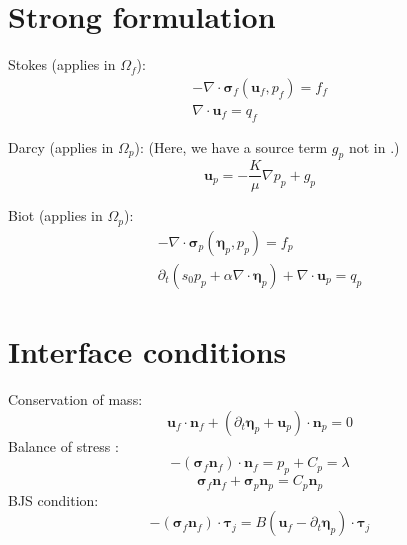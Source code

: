 \documentclass{article}
\newcommand{\mathspace}[1]{\ensuremath{#1}\xspace} %
\newcommand{\sigmabf}{\mathspace{\boldsymbol{\sigma}}}
\newcommand{\grad}{\mathspace{\nabla}}
\renewcommand{\div}{\mathspace{\nabla \cdot}}
\newcommand{\ddt}[1]{\mathspace{\partial_t #1}}
\newcommand{\taubf}{\mathspace{\boldsymbol{\tau}}}
\newcommand{\stokes}{\mathspace{\Omega_{f}}}
\newcommand{\darcy}{\mathspace{\Omega_{p}}}
\newcommand{\nf}{\mathspace{\mathbf{n}_f}}
\newcommand{\np}{\mathspace{\mathbf{n}_p}}
\newcommand{\uf}{\mathspace{\mathbf{u}_f}}
\newcommand{\up}{\mathspace{\mathbf{u}_p}}
\newcommand{\pf}{\mathspace{p_f}}
\newcommand{\pp}{\mathspace{p_p}}
\newcommand{\disp}{\mathspace{\boldsymbol{\eta}_p}}
\begin{document}
\section{Strong formulation}

Stokes (applies in \stokes):
\begin{subequations}
  \begin{align}
    - \div \sigmabf_f (\uf, \pf) = f_f    \label{eq:stokes_stress} \\
    \div \uf = q_f    \label{eq:stokes_conservation}
  \end{align}
\end{subequations}

Darcy (applies in \darcy):
(Here, we have a source term $g_p$ not in \cite{ambartsumyan}.)
\begin{equation}
    \up = - \frac {K} {\mu} \grad \pp + g_p     \label{eq:darcy}
  \end{equation}

  
Biot (applies in \darcy):
\begin{subequations}
  \begin{align}
    - \div \sigmabf_p (\disp, \pp) = f_p     \label{eq:biot_stress} \\
    \ddt{} \left ( s_0 \pp + \alpha \div \disp \right ) + \div \up = q_p    \label{eq:biot_conservation}
  \end{align}
\end{subequations}
\section{Interface conditions}

Conservation of mass:
\begin{equation}
\uf  \cdot \nf + \left ( \ddt{\disp} + \up \right ) \cdot \np = 0  \label{eq:massconservation}
\end{equation}
Balance of stress :
\begin{equation}
  -(\sigmabf_f \nf) \cdot \nf = \pp + C_p = \lambda  \label{eq:stressbalance1_mult}
\end{equation}
\begin{equation}
  \sigmabf_f \nf + \sigmabf_p \np = C_p \np \label{eq:stressbalance2}
\end{equation}
BJS condition:
\begin{equation}
  -(\sigmabf_f \nf) \cdot \taubf_j = B \left ( \uf - \ddt{\disp} \right ) \cdot \taubf_j
  \label{eq:BJS}
\end{equation}
\end{document}
